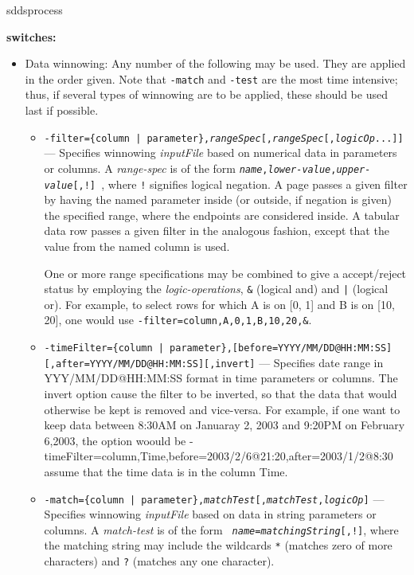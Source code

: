 \begin{sddsprog}{sddsprocess}
  \item \textbf{switches:}
    \begin{itemize}
    \item Data winnowing: Any number of the following may be used.  They are applied in the order
given.  Note that {\tt -match} and {\tt -test} are the most time intensive; thus, if several types
of winnowing are to be applied, these should be used last if possible.

   \begin{itemize}

   \item {\tt -filter=\{column | parameter\},{\em rangeSpec}[,{\em rangeSpec}[,{\em logicOp}...]] } ---
Specifies winnowing {\em inputFile} based on numerical data in parameters or columns.  A {\em range-spec} is of the
form {\tt {\em name},{\em lower-value},{\em upper-value}[,!] }, where \verb|!| signifies logical negation. A page
passes a given filter by having the named parameter inside (or outside, if negation is given) the specified range,
where the endpoints are considered inside.  A tabular data row passes a given filter in the analogous fashion, except
that the value from the named column is used.  

One or more range specifications may be combined to give a accept/reject status by employing the {\em
logic-operations}, \verb|&| (logical and) and \verb&|& (logical or).  For example, to select rows for
which A is on [0, 1] and B is on [10, 20], one would use
{\tt -filter=column,A,0,1,B,10,20,\&}.
        \item {\tt -timeFilter=\{column | parameter\},[before=YYYY/MM/DD@HH:MM:SS] [,after=YYYY/MM/DD@HH:MM:SS][,invert]} 
--- Specifies date range in YYY/MM/DD@HH:MM:SS format in time parameters or columns. The invert option cause the
filter to be inverted, so that the data that would otherwise be kept is removed and vice-versa. For example,
if one want to keep data between 8:30AM on Januaray 2, 2003 and 9:20PM on February 6,2003, the option woould be
     -timeFilter=column,Time,before=2003/2/6@21:20,after=2003/1/2@8:30
assume that the time data is in the column Time.

        \item {\tt -match=\{column | parameter\},{\em matchTest}[,{\em matchTest},{\em logicOp}]} --- Specifies
winnowing {\em inputFile} based on data in string parameters or columns.  A {\em match-test} is of the form {\tt {\em
name}={\em matchingString}[,!]}, where the matching string may include the wildcards \verb|*| (matches zero of more
characters) and \verb|?| (matches any one character). 


\end{itemize}
\end{itemize}
\end{sddsprog}
